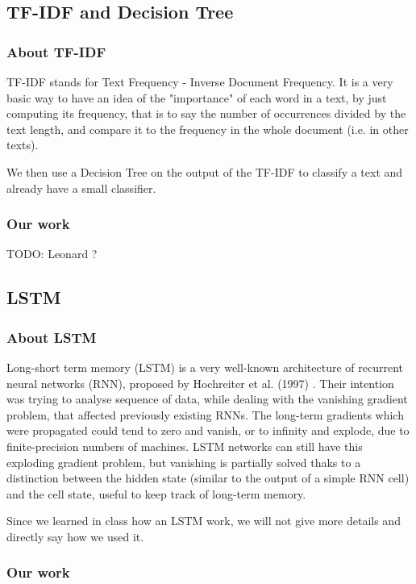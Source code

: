 \documentclass[11pt]{scrartcl}
\begin{document}
\subsection{TF-IDF and Decision Tree}

\subsubsection{About TF-IDF}
TF-IDF stands for Text Frequency - Inverse Document Frequency. It is a very basic way to have an idea of the "importance" of each word in a text, by just computing its frequency, that is to say the number of occurrences divided by the text length, and compare it to the frequency in the whole document (i.e. in other texts).

We then use a Decision Tree on the output of the TF-IDF to classify a text and already have a small classifier.

\subsubsection{Our work}

TODO: Leonard ?

\subsection{LSTM}

\subsubsection{About LSTM}

Long-short term memory (LSTM) is a very well-known architecture of recurrent neural networks (RNN), proposed by Hochreiter et al. (1997) \cite{hochreiter1997long}. Their intention was trying to analyse sequence of data, while dealing with the vanishing gradient problem, that affected previously existing RNNs. The long-term gradients which were propagated could tend to zero and vanish, or to infinity and explode, due to finite-precision numbers of machines. LSTM networks can still have this exploding gradient problem, but vanishing is partially solved thaks to a distinction between the hidden state (similar to the output of a simple RNN cell) and the cell state, useful to keep track of long-term memory.

Since we learned in class how an LSTM work, we will not give more details and directly say how we used it.

\subsubsection{Our work}
\end{document}
